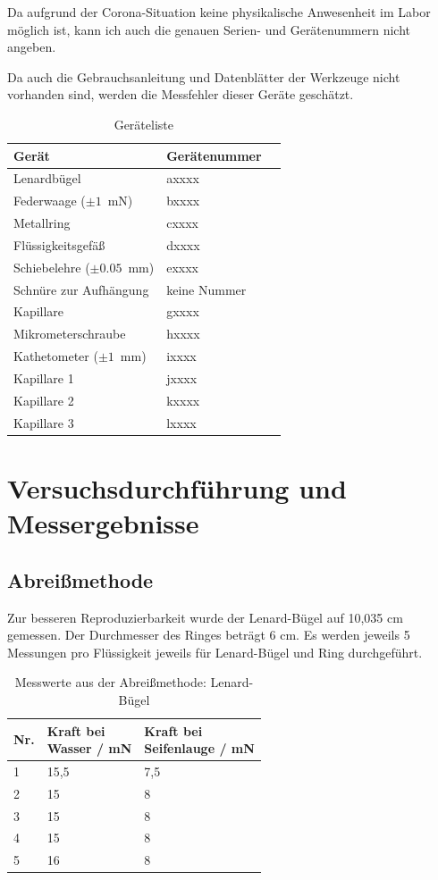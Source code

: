 \documentclass{article}
\begin{document}
Da aufgrund der Corona-Situation keine physikalische Anwesenheit im Labor möglich ist, kann ich auch die genauen Serien- und Gerätenummern nicht angeben.

Da auch die Gebrauchsanleitung und Datenblätter der Werkzeuge nicht vorhanden sind, werden die Messfehler dieser Geräte geschätzt.


\begin{table}[h]
\caption{Geräteliste}

\begin{tabular}{lll}
Gerät  & Gerätenummer \\
\hline
Lenardbügel  & axxxx \\
Federwaage ($\pm 1$~mN) & bxxxx \\
Metallring & cxxxx \\
Flüssigkeitsgefäß & dxxxx \\
Schiebelehre ($\pm 0.05$~mm) & exxxx \\
Schnüre zur Aufhängung & keine Nummer \\
Kapillare & gxxxx \\
Mikrometerschraube & hxxxx \\ %
Kathetometer ($\pm1$~mm) & ixxxx \\ %
Kapillare 1 & jxxxx \\
Kapillare 2 & kxxxx \\
Kapillare 3 & lxxxx \\
\end{tabular}
\end{table}

\newpage
\section{Versuchsdurchführung und Messergebnisse}

\subsection{Abreißmethode}

Zur besseren Reproduzierbarkeit wurde der Lenard-Bügel auf 10,035 cm gemessen. Der Durchmesser des Ringes beträgt 6 cm. Es werden jeweils 5 Messungen pro Flüssigkeit jeweils für Lenard-Bügel und Ring durchgeführt.

\begin{table}[h]
\caption{Messwerte aus der Abreißmethode: Lenard-Bügel}
\begin{tabular}{lll}
Nr. & \shortstack[l]{Kraft bei\\Wasser / mN} & \shortstack[l]{Kraft bei\\Seifenlauge / mN} \\
\hline
1 & 15,5 & 7,5 \\
2 & 15 & 8 \\
3 & 15 & 8 \\
4 & 15 & 8 \\
5 & 16 & 8
\end{tabular}
\end{table}
\end{document}
